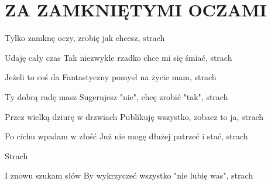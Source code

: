\documentclass[../../../songbook.tex]{subfiles}
\begin{document}
\TabPositions{9cm} %
\section*{ZA ZAMKNIĘTYMI OCZAMI}
{}
\vspace{0.5cm}
\-\hspace{1cm} Tylko zamknę oczy, zrobię jak chcesz, strach		 \newline	  

Udaję cały czas										 \newline	  
Tak niezwykle rzadko chce mi się śmiać, strach		 \newline	  

\-\hspace{1cm} Jeżeli to coś da \newline
\-\hspace{1cm} Fantastyczny pomysł na życie mam, strach \newline

Ty dobrą radę masz \newline
Sugerujesz "nie", chcę zrobić "tak", strach \newline

\-\hspace{1cm} Przez wielką dziurę w drzwiach \newline
\-\hspace{1cm} Publikuję wszystko, zobacz to ja, strach \newline

Po cichu wpadam w złość \newline
Już nie mogę dłużej patrzeć i stać, strach \newline

\-\hspace{1cm} Strach \newline

I znowu szukam słów \newline
By wykrzyczeć wszystko "nie lubię was", strach \newline
\end{document}
